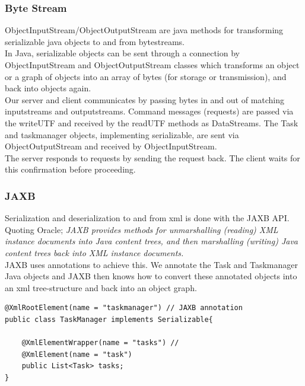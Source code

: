 \subsubsection{Byte Stream}
ObjectInputStream/ObjectOutputStream are java methods for transforming serializable java objects to and from bytestreams. \\ 

In Java,  serializable objects can be sent through a connection by  ObjectInputStream and ObjectOutputStream classes which transforms an object or a graph of objects into an array of bytes (for storage or transmission), and back into objects again. \\

Our server and client communicates by passing bytes in and out of matching inputstreams and outputstreams. Command messages (requests) are passed via the writeUTF and received by the readUTF methods as DataStreams. The Task and taskmanager objects, implementing serializable, are sent via ObjectOutputStream and received by ObjectInputStream. \\

The server responds to requests by sending the request back. The client waits for this confirmation before proceeding. \\

\subsubsection{JAXB}
Serialization and deserialization to and from xml is done with the JAXB API. Quoting Oracle; \textit{JAXB provides methods for unmarshalling (reading) XML instance documents into Java content trees, and then marshalling (writing) Java content trees back into XML instance documents.} \\

JAXB uses annotations to achieve this. We annotate the Task and Taskmanager Java objects and JAXB then knows how to convert these annotated objects into an xml tree-structure and back into an object graph.\\

\begin{lstlisting}
@XmlRootElement(name = "taskmanager") // JAXB annotation
public class TaskManager implements Serializable{

	@XmlElementWrapper(name = "tasks") // 
    @XmlElement(name = "task")
    public List<Task> tasks;
}
\end{lstlisting}

